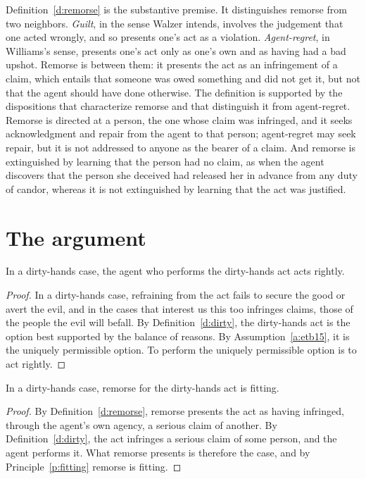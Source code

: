\documentclass{situationist-preprint}
\begin{document}
Definition~\ref{d:remorse} is the substantive premise. It distinguishes remorse from two neighbors. \emph{Guilt}, in the sense Walzer intends, involves the judgement that one acted wrongly, and so presents one's act as a violation. \emph{Agent-regret}, in Williams's sense, presents one's act only as one's own and as having had a bad upshot. Remorse is between them: it presents the act as an infringement of a claim, which entails that someone was owed something and did not get it, but not that the agent should have done otherwise. The definition is supported by the dispositions that characterize remorse and that distinguish it from agent-regret. Remorse is directed at a person, the one whose claim was infringed, and it seeks acknowledgment and repair from the agent to that person; agent-regret may seek repair, but it is not addressed to anyone as the bearer of a claim. And remorse is extinguished by learning that the person had no claim, as when the agent discovers that the person she deceived had released her in advance from any duty of candor, whereas it is not extinguished by learning that the act was justified.

\section{The argument}

\begin{theorem}\label{t:right}
In a dirty-hands case, the agent who performs the dirty-hands act acts rightly.
\end{theorem}

\begin{proof}
In a dirty-hands case, refraining from the act fails to secure the good or avert the evil, and in the cases that interest us this too infringes claims, those of the people the evil will befall. By Definition~\ref{d:dirty}, the dirty-hands act is the option best supported by the balance of reasons. By Assumption~\ref{a:etb15}, it is the uniquely permissible option. To perform the uniquely permissible option is to act rightly.
\end{proof}

\begin{theorem}\label{t:remorse}
In a dirty-hands case, remorse for the dirty-hands act is fitting.
\end{theorem}

\begin{proof}
By Definition~\ref{d:remorse}, remorse presents the act as having infringed, through the agent's own agency, a serious claim of another. By Definition~\ref{d:dirty}, the act infringes a serious claim of some person, and the agent performs it. What remorse presents is therefore the case, and by Principle~\ref{p:fitting} remorse is fitting.
\end{proof}
\end{document}

